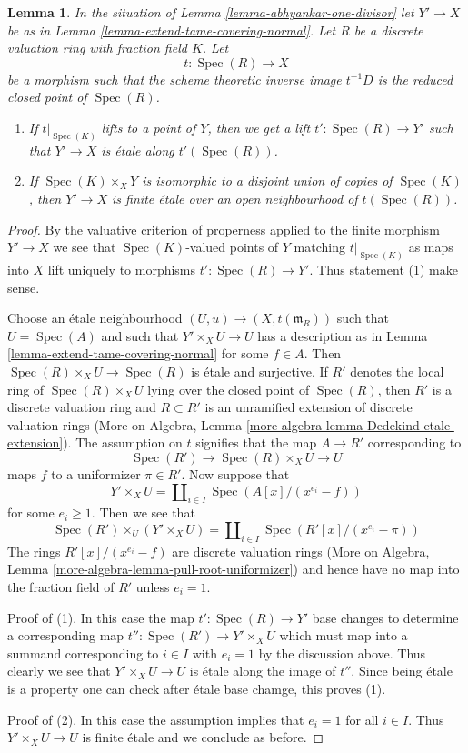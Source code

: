 \documentclass{stacks-project}
\theoremstyle{plain}
\newtheorem{lemma}[subsection]{Lemma}
\theoremstyle{definition}
\theoremstyle{remark}
\numberwithin{equation}{subsection}
\def\Spec{\mathop{\mathrm{Spec}}}
\begin{document}
\begin{lemma}
\label{lemma-tame-covering-split}
In the situation of Lemma \ref{lemma-abhyankar-one-divisor}
let $Y' \to X$ be as in Lemma \ref{lemma-extend-tame-covering-normal}.
Let $R$ be a discrete valuation ring with fraction field $K$.
Let
$$
t : \Spec(R) \to X
$$
be a morphism such that the scheme theoretic inverse image
$t^{-1}D$ is the reduced closed point of $\Spec(R)$.
\begin{enumerate}
\item If $t|_{\Spec(K)}$ lifts to a point of $Y$, then
we get a lift $t' : \Spec(R) \to Y'$ such that $Y' \to X$
is \'etale along $t'(\Spec(R))$.
\item If $\Spec(K) \times_X Y$ is isomorphic to a disjoint union
of copies of $\Spec(K)$, then $Y' \to X$ is finite \'etale
over an open neighbourhood of $t(\Spec(R))$.
\end{enumerate}
\end{lemma}

\begin{proof}
By the valuative criterion of properness applied to
the finite morphism $Y' \to X$ we see that $\Spec(K)$-valued
points of $Y$ matching $t|_{\Spec(K)}$ as maps into $X$
lift uniquely to morphisms $t' : \Spec(R) \to Y'$.
Thus statement (1) make sense.

\medskip\noindent
Choose an \'etale neighbourhood $(U, u) \to (X, t(\mathfrak m_R))$
such that $U = \Spec(A)$ and such that $Y' \times_X U \to U$
has a description as in Lemma \ref{lemma-extend-tame-covering-normal}
for some $f \in A$. Then $\Spec(R) \times_X U \to \Spec(R)$ is \'etale
and surjective. If $R'$ denotes the local ring of
$\Spec(R) \times_X U$ lying over the closed point of $\Spec(R)$,
then $R'$ is a discrete valuation ring and $R \subset R'$
is an unramified extension of discrete valuation rings
(More on Algebra, Lemma \ref{more-algebra-lemma-Dedekind-etale-extension}).
The assumption on $t$ signifies that the map $A \to R'$
corresponding to
$$
\Spec(R') \to \Spec(R) \times_X U \to U
$$
maps $f$ to a uniformizer $\pi \in R'$. Now suppose that
$$
Y' \times_X U =
\coprod\nolimits_{i \in I} \Spec(A[x]/(x^{e_i} - f))
$$
for some $e_i \geq 1$. Then we see that
$$
\Spec(R') \times_U (Y' \times_X U) =
\coprod\nolimits_{i \in I} \Spec(R'[x]/(x^{e_i} - \pi))
$$
The rings $R'[x]/(x^{e_i} - f)$ are discrete valuation rings
(More on Algebra, Lemma \ref{more-algebra-lemma-pull-root-uniformizer})
and hence have no map into the fraction field of $R'$ unless $e_i = 1$.

\medskip\noindent
Proof of (1). In this case the map $t' : \Spec(R) \to Y'$ base changes
to determine a corresponding map $t'' : \Spec(R') \to Y' \times_X U$
which must map into a summand corresponding to $i \in I$ with $e_i = 1$
by the discussion above. Thus clearly we see that $Y' \times_X U \to U$
is \'etale along the image of $t''$. Since being \'etale is a property
one can check after \'etale base chamge, this proves (1).

\medskip\noindent
Proof of (2). In this case the assumption implies that $e_i = 1$
for all $i \in I$. Thus $Y' \times_X U \to U$ is finite \'etale
and we conclude as before.
\end{proof}
\end{document}
